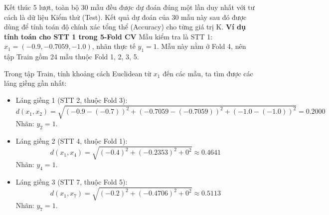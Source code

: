 \documentclass[12pt,a4paper]{article}
\begin{document}
Kết thúc 5 lượt, toàn bộ 30 mẫu đều được dự đoán đúng một lần duy nhất với tư cách là dữ liệu Kiểm thử (Test). Kết quả dự đoán của 30 mẫu này sau đó được dùng để tính toán độ chính xác tổng thể (Accuracy) cho từng giá trị K.
\textbf{Ví dụ tính toán cho STT 1 trong 5-Fold CV}
Mẫu kiểm tra là STT 1: $x_1 = (-0.9, -0.7059, -1.0)$, nhãn thực tế $y_1 = 1$. Mẫu này nằm ở Fold 4, nên tập Train gồm 24 mẫu thuộc Fold 1, 2, 3, 5.

Trong tập Train, tính khoảng cách Euclidean từ $x_1$ đến các mẫu, ta tìm được các láng giềng gần nhất:
\begin{itemize}
    \item Láng giềng 1 (STT 2, thuộc Fold 3): 
    $$d(x_1, x_2) = \sqrt{(-0.9 - (-0.7))^2 + (-0.7059 - (-0.7059))^2 + (-1.0 - (-1.0))^2} = 0.2000$$
    Nhãn: $y_2 = 1$.
    
    \item Láng giềng 2 (STT 4, thuộc Fold 1): 
    $$d(x_1, x_4) = \sqrt{(-0.4)^2 + (-0.2353)^2 + 0^2} \approx 0.4641$$
    Nhãn: $y_4 = 1$.
    
    \item Láng giềng 3 (STT 7, thuộc Fold 5): 
    $$d(x_1, x_7) = \sqrt{(-0.2)^2 + (-0.4706)^2 + 0^2} \approx 0.5113$$
    Nhãn: $y_7 = 1$.
\end{itemize}
\end{document}
